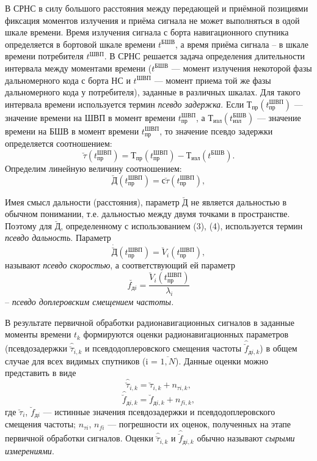 В СРНС в силу большого расстояния между передающей и приёмной позициями фиксация моментов излучения и приёма сигнала не может выполняться в одой шкале времени. Время излучения сигнала с борта навигационного спутника определяется в бортовой шкале времени $t^{БШВ}$, а время приёма сигнала -- в шкале времени потребителя $t^{ШВП}$. В СРНС решается задача определения длительности интервала между моментами времени ($t^{БШВ}$ — момент
излучения некоторой фазы дальномерного кода с борта НС и $t^{ШВП}$ — момент приема той же фазы дальномерного кода у потребителя), заданные в различных шкалах. Для такого интервала времени используется термин \textit{псевдо задержка}. Если $Т_{пр}(t^{ШВП}_{пр})$ — значение времени на ШВП в момент времени
$t^{ШВП}_{пр}$, а $Т_{изл}(t^{БШВ}_{изл})$ — значение времени на БШВ в момент времени $t^{ШВП}_{пр}$, то значение псевдо задержки определяется соотношением:
\begin{equation}
	\breve{\tau}(t^{ШВП}_{пр})=Т_{пр}(t^{ШВП}_{пр})-Т_{изл}(t^{БШВ}).
\end{equation}
Определим линейную величину соотношением:
\begin{equation}
	\breve{Д}(t^{ШВП}_{пр})=с\breve{\tau}(t^{ШВП}_{пр}),
\end{equation}

Имея смысл дальности (расстояния), параметр $\breve{Д}$ не является дальностью в обычном понимании, т.е. дальностью между двумя точками в пространстве. Поэтому для $\breve{Д}$, определенному с использованием (3), (4), используется термин \textit{псевдо дальность}. Параметр
\begin{equation}
	\dot{\breve{Д}}(t^{ШВП}_{пр})=\breve{V}_i(t^{ШВП}_{пр}),
\end{equation}
называют \textit{псевдо скоростью}, а соответствующий ей параметр 
\begin{equation}
	\breve{f_{дi}}=\frac{\breve{V}_i(t^{ШВП}_{пр})}{\lambda_i}
\end{equation}
-- \textit{псевдо доплеровским смещением частоты.}

В результате первичной обработки радионавигационных сигналов в 
заданные моменты времени $t_k$ формируются оценки радионавигационных параметров (псевдозадержки $\hat{\breve{\tau}}_{i,k}$ и псевдодоплеровского смещения частоты $ \hat{\breve{f}}_{дi,k}$) в
общем случае для всех видимых спутников (i = $\overline{1,N}$). Данные оценки можно представить в виде
\begin{equation}
	\hat{\breve{\tau}}_{i,k}=\breve{\tau}_{i,k}+n_{\tau i,k},
\end{equation}
\begin{equation}
		\hat{\breve{f}}_{дi,k}=\breve{f}_{д i,k}+n_{f i,k},
\end{equation}
где $\breve{\tau}_{i}$, $\breve{f}_{д i}$ — истинные значения псевдозадержки и псевдодоплеровского смещения частоты; $n_{\tau i}$, $n_{f i}$ — погрешности их оценок, полученных на этапе первичной обработки сигналов. Оценки $\hat{\breve{\tau}}_{i,k}$ и $\hat{\breve{f}}_{дi,k}$ обычно называют \textit{сырыми измерениями}.


